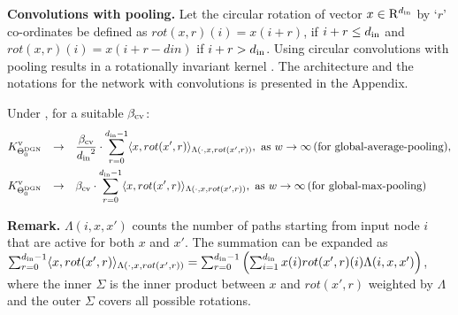 \textbf{Convolutions with pooling.} Let the circular rotation of vector $x\in\mathrm{R}^{d_{\text{in}}}$ by `$r$' co-ordinates be defined as $rot(x,r)(i)=x(i+ r)$, if $i+r \leq d_{\text{in}}$ and $rot(x,r)(i)=x(i+ r-din)$ if $i+r > d_{\text{in}}$. Using circular convolutions with pooling results in a rotationally invariant kernel . The architecture and the notations for the network with convolutions is presented in the Appendix.

\begin{theorem}\label{th:mainconv} Under , for  a suitable $\beta_{\text{cv}}$:
\begin{align*}
&K^{\text{v}}_{\Theta^{\text{DGN}}_0}&\rightarrow&\quad \frac{\beta_{\text{cv}}}{{d_{\text{in}}}^2} \cdot \sum_{r=0}^{d_{\text{in}}-1} \langle x,rot(x',r)\rangle_{\Lambda(\cdot, x,rot(x',r))},\,\, \text{as}\,\,  w\rightarrow\infty\,\text{(for global-average-pooling)}, \\
&K^{\text{v}}_{\Theta^{\text{DGN}}_0}&\rightarrow& \quad{\beta_{\text{cv}}} \cdot \sum_{r=0}^{d_{\text{in}}-1} \langle x,rot(x',r)\rangle_{\Lambda(\cdot, x,rot(x',r))},\,\, \text{as}\,\,  w\rightarrow\infty\,\text{(for global-max-pooling)}
\end{align*}
\end{theorem}
\textbf{Remark.}  $\Lambda(i,x,x')$ counts the number of paths starting from input node $i$ that are active for both $x$ and $x'$. The summation can be expanded as $\sum_{r=0}^{d_{\text{in}}-1} \langle x,rot(x',r)\rangle_{\Lambda(\cdot, x,rot(x',r))}=\sum_{r=0}^{d_{\text{in}}-1} \left(\sum_{i=1}^{d_{\text{in}}} x(i) rot(x',r)(i)\Lambda(i,x,x')\right)$, where the inner $\Sigma$ is the inner product between $x$ and $rot(x',r)$ weighted by $\Lambda$ and the outer $\Sigma$ covers all possible rotations.

